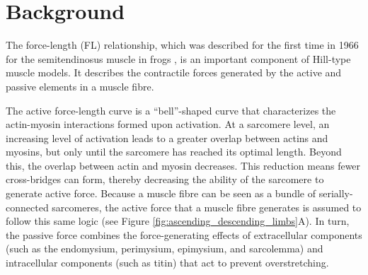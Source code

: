 \documentclass{sfuthesis}
\numberwithin{equation}{section}
\numberwithin{figure}{chapter}
\numberwithin{table}{chapter}
\theoremstyle{definition}
\begin{document}


\section{Background}

The force-length (FL) relationship, which was described for the first time in 1966 for the semitendinosus muscle in frogs \cite{GordonHuxleyJulian1966}, is an important component of Hill-type muscle models. It describes the contractile forces generated by the active and passive elements in a muscle fibre. 

The active force-length curve is a ``bell''-shaped curve that characterizes the actin-myosin interactions formed upon activation. At a sarcomere level, an increasing level of activation leads to a greater overlap between actins and myosins, but only until the sarcomere has reached its optimal length. Beyond this, the overlap between actin and myosin decreases. This reduction means fewer cross-bridges can form, thereby decreasing the ability of the sarcomere to generate active force. Because a muscle fibre can be seen as a bundle of serially-connected sarcomeres, the active force that a muscle fibre generates is assumed to follow this same logic (see Figure \ref{fig:ascending_descending_limbs}A). In turn, the passive force combines the force-generating effects of extracellular components (such as the endomysium, perimysium, epimysium, and sarcolemma) and intracellular components (such as titin) that act to prevent overstretching.
\end{document}
